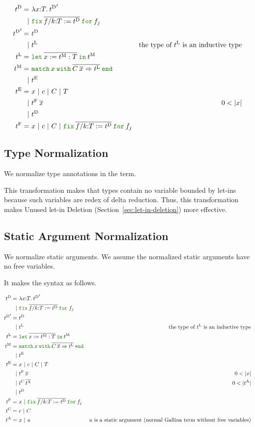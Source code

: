 \documentclass[a4paper,fleqn]{article}
\def\gallina{\textrm{Gallina}}
\newcommand{\kwlet}{\mbox{\color{mygreen}\ttfamily let}}
\newcommand{\kwin}{\mbox{\color{mygreen}\ttfamily in}}
\newcommand{\kwmatch}{\mbox{\color{mygreen}\ttfamily match}}
\newcommand{\kwwith}{\mbox{\color{mygreen}\ttfamily with}}
\newcommand{\kwend}{\mbox{\color{mygreen}\ttfamily end}}
\newcommand{\kwfix}{\mbox{\color{mygreen}\ttfamily fix}}
\newcommand{\kwfor}{\mbox{\color{mygreen}\ttfamily for}}
\newcommand{\lamT}[3]{\lambda #1\mathord{:}#2.\:#3}
\newcommand{\letinM}[3]{\kwlet\:\rep{#1:=#2}\:\kwin\:#3}
\newcommand{\omatch}[2]{\kwmatch\:#1\:\kwwith\:{#2}\:\kwend}
\newcommand{\ofix}[2]{\kwfix\:{#1}\:\kwfor\:{#2}}
\newcommand{\tD}{{t^\mathrm{D}}}
\newcommand{\tE}{{t^\mathrm{E}}}
\newcommand{\tL}{{t^\mathrm{L}}}
\newcommand{\tM}{{t^\mathrm{M}}}
\newcommand{\tF}{{t^\mathrm{F}}}
\newcommand{\tC}{{t^\mathrm{C}}}
\newcommand{\tA}{{t^\mathrm{A}}}
\newcommand{\secref}[1]{Section~\ref{#1}}
\newcommand{\rep}[1]{\overline{#1}}
\begin{document}
\begin{align*}
  \tD =&\ \lamT{x}{T}{\tD'} \\
      |&\ \ofix{\overline{f/k{:}T:=\tD}}{f_j} \\
  \tD' =&\ \tD \\
       |&\ \tL & \text{the type of $\tL$ is an inductive type} \\
  \tL =&\ \letinM{x}{\tM:T}{\tM} \\
  \tM =&\ \omatch{x}{\overline{C\:\overline{x}\Rightarrow \tL}} \\
      |&\ \tE \\
  \tE =&\ x ~|~ c ~|~ C ~|~ T \\
    |&\ \tF\:\rep{x} & \text{$0 < |x|$} \\
    |&\ \tD \\
  \tF =&\ x ~|~ c ~|~ C ~|~ \ofix{\overline{f/k{:}T:=\tD}}{f_j}
\end{align*}

\subsection{Type Normalization}\label{sec:type-normalization}

We normalize type annotations in the term.

This transformation makes that types contain no variable bounded by let-ins
because such variables are redex of delta reduction.
Thus, this transformation makes Unused let-in Deletion (\secref{sec:let-in-deletion}) more effective.

\subsection{Static Argument Normalization}\label{sec:static-argument-normalization}

We normalize static arguments.
We assume the normalized static arguments have no free variables.

It makes the syntax as follows.

\begin{align*}
  \tD =&\ \lamT{x}{T}{\tD'} \\
      |&\ \ofix{\overline{f/k{:}T:=\tD}}{f_j} \\
  \tD' =&\ \tD \\
       |&\ \tL & \text{the type of $\tL$ is an inductive type} \\
  \tL =&\ \letinM{x}{\tM:T}{\tM} \\
  \tM =&\ \omatch{x}{\overline{C\:\overline{x}\Rightarrow \tL}} \\
      |&\ \tE \\
  \tE =&\ x ~|~ c ~|~ C ~|~ T \\
    |&\ \tF\:\rep{x} & \text{$0 < |x|$} \\
    |&\ \tC\:\rep{\tA} & \text{$0 < |\tA|$} \\
    |&\ \tD \\
  \tF =&\ x ~|~ \ofix{\overline{f/k{:}T:=\tD}}{f_j} \\
  \tC =&\ c ~|~ C \\
  \tA =&\ x ~|~ u & \text{$u$ is a static argument (normal \gallina{} term without free variables)}
\end{align*}
\end{document}
